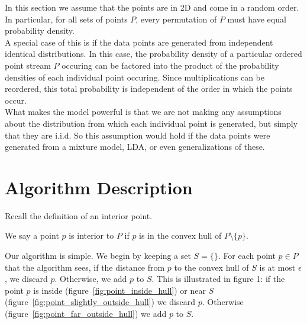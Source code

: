 
In this section we assume that the points are in 2D and come in a random order. In particular, for all sets of points $P$, every permutation of $P$ must have equal probability density.
\\

A special case of this is if the data points are generated from independent identical distributions. In this case, the probability density of a particular ordered point stream $P$ occuring can be factored into the product of the probability densities of each individual point occuring. Since multiplications can be reordered, this total probability is independent of the order in which the points occur.
\\

What makes the model powerful is that we are not making any assumptions about the distribution from which each individual point is generated, but simply that they are i.i.d. So this assumption would hold if the data points were generated from a mixture model, LDA, or even generalizations of these.
\\

\section{Algorithm Description}

Recall the definition of an interior point.

\begin{definition}
We say a point $p$ is interior to $P$ if $p$ is in the convex hull of $P \setminus \{p\}$.
\end{definition}

Our algorithm is simple. We begin by keeping a set $S = \{\}$. For each point $p \in P$ that the algorithm sees, if the distance from $p$ to the convex hull of $S$ is at most $\epsilon$, we discard $p$. Otherwise, we add $p$ to $S$. This is illustrated in figure 1: if the point $p$ is inside (figure~\ref{fig:point_inside_hull}) or near $S$ (figure~\ref{fig:point_slightly_outside_hull}) we discard $p$. Otherwise (figure~\ref{fig:point_far_outside_hull}) we add $p$ to $S$.
\\

